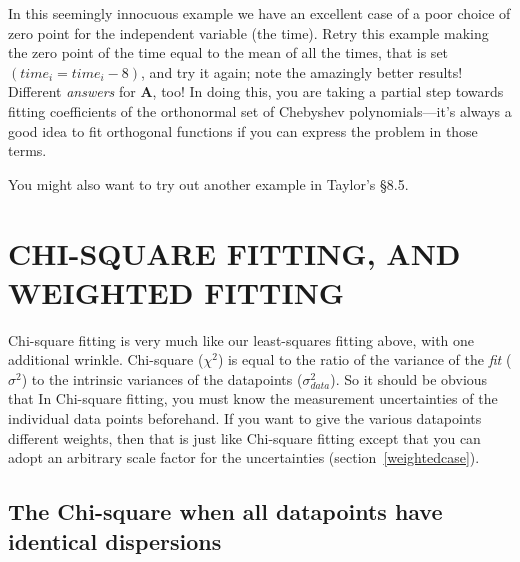 	In this seemingly innocuous example we have an excellent case of
a poor choice of zero point for the independent variable (the time). 
Retry this example making the zero point of the time equal to the mean
of all the times, that is set $(time_i = time_i - 8)$, and try it again;
note the amazingly better results! Different {\it answers} for {\bf A},
too! In doing this, you are taking a partial step towards fitting
coefficients of the orthonormal set of Chebyshev polynomials---it's
always a good idea to fit orthogonal functions if you can express the
problem in those terms. 

	You might also want to try out another example in Taylor's \S 8.5.

\section{CHI-SQUARE FITTING, AND WEIGHTED FITTING}

	Chi-square fitting is very much like our least-squares fitting
above, with one additional wrinkle.  Chi-square ($\chi^2$) is equal to
the ratio of the variance of the {\it fit} ($\sigma^2$) to the intrinsic
variances of the datapoints ($\sigma_{data}^2$).  So it should be
obvious that In Chi-square fitting, you must know the measurement
uncertainties of the individual data points beforehand.  If you want to
give the various datapoints different weights, then that is just like
Chi-square fitting except that you can adopt an arbitrary scale factor
for the uncertainties (section~\ref{weightedcase}). 

\subsection{The Chi-square when all datapoints have identical dispersions}
\label{sectionchisq}

